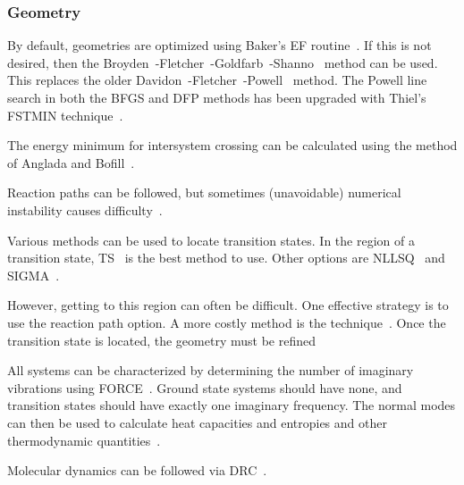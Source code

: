 \subsubsection*{Geometry}
By default, geometries are optimized using Baker's EF routine~\cite{ef-ts}. If
this is not desired, then the
Broyden~\cite{bfgs1}-Fletcher~\cite{bfgs2}-Goldfarb~\cite{bfgs3}-Shanno~\cite{bfgs4}
method can be used. This replaces the older
Davidon~\cite{dfp1}-Fletcher~\cite{dfp2}-Powell~\cite{dfp3} method.   The
Powell line search in both the BFGS and DFP methods has been upgraded with
Thiel's FSTMIN technique~\cite{fstmin}.

The energy minimum for intersystem crossing can be calculated using the method
of Anglada and Bofill~\cite{cross}.

Reaction paths can be followed, but sometimes (unavoidable) numerical
instability causes difficulty~\cite{boyd}.

Various methods can be used to locate transition states. In the region  of a
transition state, TS~\cite{ef-ts} is the best method to use. Other options are
NLLSQ~\cite{nllsq} and SIGMA~\cite{sigma1,sigma2}.

However, getting to this region can often be difficult.  One effective strategy
is to use the reaction path option.  A more costly method is the 
technique~\cite{saddle}.  Once the transition state is located, the geometry
must be refined

All systems can be characterized by determining the number of imaginary
vibrations using FORCE~\cite{pulayf}.  Ground state systems should have none,
and transition states should have exactly one imaginary frequency. The normal
modes can then be used to calculate heat capacities and entropies and other
thermodynamic quantities~\cite{thermo}.

Molecular dynamics can be followed via DRC~\cite{drc}.

